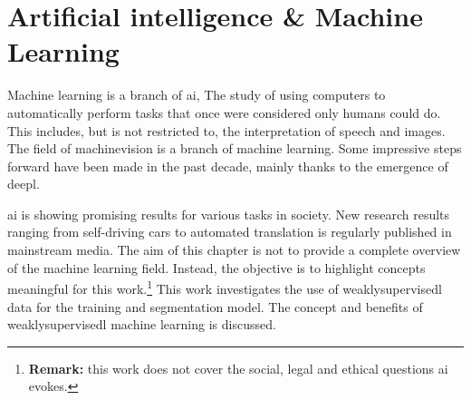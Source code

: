 \chapter{Artificial intelligence \& Machine Learning\label{sec:ai_and_ml}}\thispagestyle{empty}
\par{
    Machine learning is a branch of \Gls{ai}, The study of using computers to automatically perform tasks that once were considered only humans could do. This includes, but is not restricted to, the interpretation of speech and images. 
    The field of \Gls{machinevision} is a branch of machine learning.
    Some impressive steps forward have been made in the past decade, mainly thanks to the emergence of \Gls{deepl}.
}
\par{
    \Gls{ai} is showing promising results for various tasks in society.
    New research results ranging from self-driving cars to automated translation is regularly published in mainstream media.
    The aim of this chapter is not to provide a complete overview of the machine learning field.
    Instead, the objective is to highlight concepts meaningful for this work.\footnote{
        \textbf{Remark:} this work does not cover the social, legal and ethical questions \Gls{ai} evokes.
    }
    This work investigates the use of \Gls{weaklysupervisedl} data for the training and segmentation model. 
    The concept and benefits of \Gls{weaklysupervisedl} machine learning is discussed.
}

